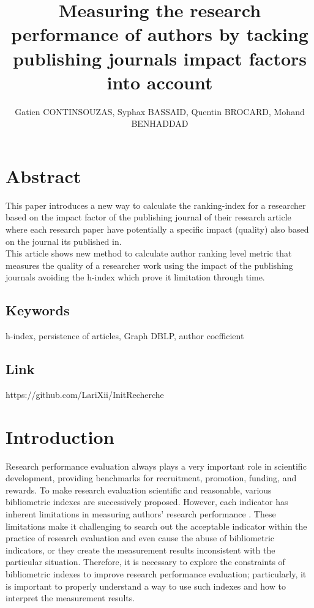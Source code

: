 \documentclass[times, twoside]{zHenriquesLab-StyleBioRxiv}
\begin{document}
\title{Measuring the research performance of authors by tacking publishing journals impact factors into account}
\shorttitle{}

\author{Gatien CONTINSOUZAS, Syphax BASSAID, Quentin BROCARD, Mohand BENHADDAD}



\maketitle

\section*{Abstract}
This paper introduces a new way to calculate the ranking-index for a researcher based on the impact factor of the publishing journal of their research article where each research paper have potentially a specific impact (quality) also based on the journal its published in.\\
This article shows new method to calculate author ranking level metric that measures the quality of a researcher work using the impact of the publishing journals avoiding the h-index which prove it limitation through time.   


\subsection*{Keywords}
h-index, persistence of articles, Graph DBLP, author coefficient

\subsection*{Link}
https://github.com/LariXii/InitRecherche\cite{larix}

\section*{Introduction} 
Research performance evaluation always plays a very important role in scientific development, providing benchmarks for recruitment, promotion, funding, and rewards. To make research evaluation scientific and reasonable, various bibliometric indexes are successively proposed.
However, each indicator has inherent limitations in measuring authors’ research performance \cite{agarwal2016bibliometrics}. These limitations make it challenging to search out the acceptable indicator within the practice of research evaluation and even cause the abuse of bibliometric indicators, or they create the measurement results inconsistent with the particular situation. Therefore, it is necessary to explore the constraints of bibliometric indexes to improve research performance evaluation; particularly, it is important to properly understand a way to use such indexes and how to interpret the measurement results.\\
\end{document}

